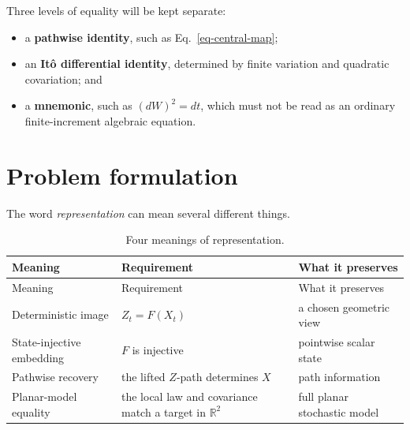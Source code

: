 \documentclass[
  english,
  10pt,
  letterpaper,
  DIV=11,
  numbers=noendperiod]{scrartcl}
\providecommand{\tightlist}{%
  \setlength{\itemsep}{0pt}\setlength{\parskip}{0pt}}
\theoremstyle{plain}
\theoremstyle{remark}
\begin{document}
Three levels of equality will be kept separate:

\begin{itemize}
\tightlist
\item
  a \textbf{pathwise identity}, such as Eq.~\ref{eq-central-map};
\item
  an \textbf{Itô differential identity}, determined by finite variation
  and quadratic covariation; and
\item
  a \textbf{mnemonic}, such as \((dW)^2=dt\), which must not be read as
  an ordinary finite-increment algebraic equation.
\end{itemize}

\section{Problem formulation}\label{sec-problem}

The word \emph{representation} can mean several different things.

\begin{longtable}[]{@{}
  >{\raggedright\arraybackslash}p{}
  >{\raggedright\arraybackslash}p{}
  >{\raggedright\arraybackslash}p{}@{}}
\caption{Four meanings of
representation.}\label{tbl-representation}\tabularnewline
\toprule\noalign{}
\begin{minipage}[b]{\linewidth}\raggedright
Meaning
\end{minipage} & \begin{minipage}[b]{\linewidth}\raggedright
Requirement
\end{minipage} & \begin{minipage}[b]{\linewidth}\raggedright
What it preserves
\end{minipage} \\
\midrule\noalign{}
\endfirsthead
\toprule\noalign{}
\begin{minipage}[b]{\linewidth}\raggedright
Meaning
\end{minipage} & \begin{minipage}[b]{\linewidth}\raggedright
Requirement
\end{minipage} & \begin{minipage}[b]{\linewidth}\raggedright
What it preserves
\end{minipage} \\
\midrule\noalign{}
\endhead
\bottomrule\noalign{}
\endlastfoot
Deterministic image & \(Z_t=F(X_t)\) & a chosen geometric view \\
State-injective embedding & \(F\) is injective & pointwise scalar
state \\
Pathwise recovery & the lifted \(Z\)-path determines \(X\) & path
information \\
Planar-model equality & the local law and covariance match a target in
\(\mathbb R^2\) & full planar stochastic model \\
\end{longtable}
\end{document}
